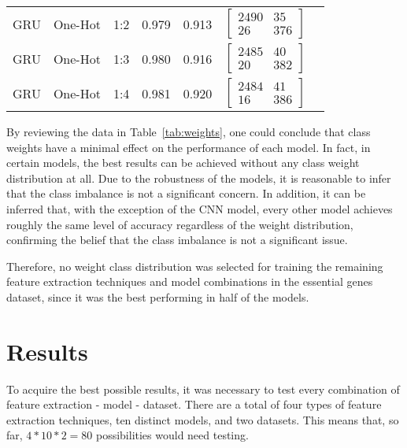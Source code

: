 \begin{table}[ht]
\begin{tabular}{lllllll}
        GRU & One-Hot & 1:2 & 0.979 & 0.913 & 
    	$\begin{bmatrix}
            2490 & 35\\ 
            26 & 376
        \end{bmatrix}$
        \\
        
        GRU & One-Hot & 1:3 & 0.980 & 0.916 & 
    	$\begin{bmatrix}
            2485 & 40\\ 
            20 & 382
        \end{bmatrix}$
        \\
        
        GRU & One-Hot & 1:4 & 0.981 & 0.920 & 
    	$\begin{bmatrix}
            2484 & 41\\ 
            16 & 386
        \end{bmatrix}$
        \\
        
    	\bottomrule
    \end{tabular}
\end{table}

By reviewing the data in Table~\ref{tab:weights}, one could conclude that class weights have a minimal effect on the performance of each model. In fact, in certain models, the best results can be achieved without any class weight distribution at all. Due to the robustness of the models, it is reasonable to infer that the class imbalance is not a significant concern. In addition, it can be inferred that, with the exception of the \gls{CNN} model, every other model achieves roughly the same level of accuracy regardless of the weight distribution, confirming the belief that the class imbalance is not a significant issue.

Therefore, no weight class distribution was selected for training the remaining feature extraction techniques and model combinations in the essential genes dataset, since it was the best performing in half of the models.


\section{Results}\label{lab:results}

To acquire the best possible results, it was necessary to test every combination of feature extraction - model - dataset. There are a total of four types of feature extraction techniques, ten distinct models, and two datasets. This means that, so far, $4*10*2 = 80$ possibilities would need testing. 

